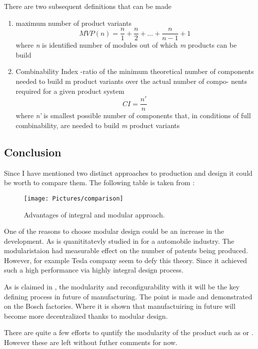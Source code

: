 \documentclass[]{scrartcl}
\begin{document}
There are two subsequent definitions that can be made
\begin{enumerate}
	\item maximum number of product variants
	\subitem
	\begin{equation}
	MVP(n) = \frac{n}{1} + \frac{n}{2}+\ldots+\frac{n}{n-1}+1
	\end{equation}
	where \emph{n} is identified number of modules out of which \emph{m} products can be build
	\item Combinability Index -ratio of the minimum theoretical number of components needed to build m product variants over the actual number of compo- nents required for a given product system
	\subitem 
	\begin{equation}
	CI = \frac{n'}{n}
	\end{equation}
	where \emph{n'} is smallest possible number of components that, in conditions of full combinability, are needed to build \emph{m} product variants
\end{enumerate}


\subsection{Conclusion}

Since I have mentioned two distinct approaches to production and design it could be worth to compare them. The following table is taken from \cite{JulianaHsuanMikkola2003}:
\begin{figure}[h!]
	\centering
	\texttt{[image: Pictures/comparison]}
	\caption{Advantages of integral and modular approach.}
	\label{fig:comparison}
\end{figure}


One of the reasons to choose modular design could be an increase in the development. As is quanititatevly studied in \cite{Wang2010} for a automobile industry. The modularistaion had measurable effect on the number of patents being produced. However, for example Tesla company seem to defy this theory. Since it achieved such a high performance via highly integral design process. 

As is claimed in \cite{Sch??fer2007}, the modularity and reconfigurability with it will be the key defining process in future of manufacturing. The point is made and demonstrated on the Bosch factories.  Where it is shown that manufactuiring in future will become more decentralized thanks to modular design.

There are quite a few efforts to quntify the modularity of the product such as \cite{Huang1998} or \cite{Ji2012}. However these are left without futher comments for now. 
\end{document}
